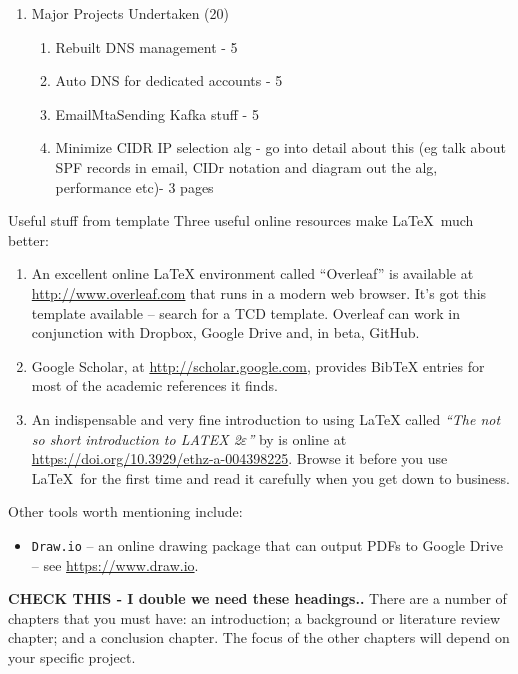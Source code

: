 \begin{enumerate}
    \item Major Projects Undertaken (20)
    \begin{enumerate}
    	\item Rebuilt DNS management - 5
        \item Auto DNS for dedicated accounts - 5
    	\item EmailMtaSending Kafka stuff - 5
    	\item Minimize CIDR IP selection alg - go into detail about this (eg talk about SPF records in email, CIDr notation and diagram out the alg, performance etc)- 3 pages
    \end{enumerate}
    
\end{enumerate}


Useful stuff from template
Three useful online resources make \LaTeX~much better:
\begin{enumerate}
\item An excellent online \LaTeX{} environment called ``Overleaf'' is available at \url{http://www.overleaf.com} that runs in a modern web browser. It's got this template available -- search for a TCD template. Overleaf can work in conjunction with Dropbox, Google Drive and, in beta, GitHub.
\item Google Scholar, at \url{http://scholar.google.com}, provides BibTeX entries for most of the academic references it finds.
\item An indispensable and very fine introduction to using \LaTeX{} called \emph{``The not so short introduction to LATEX 2$\varepsilon$''} by \citet{oetiker2001not} is online at \url{https://doi.org/10.3929/ethz-a-004398225}. Browse it before you use \LaTeX~for the first time and  read it carefully when you get down to business.
\end{enumerate}
Other tools worth mentioning include:
\begin{itemize}
\item \texttt{Draw.io} -- an online drawing package that can output PDFs to Google Drive -- see \url{https://www.draw.io}.
\end{itemize}

\textbf{CHECK THIS - I double we need these headings..}
There are a number of chapters that you must have: an introduction; a background or literature review chapter; and a conclusion chapter. The focus of the other chapters will depend on your specific project.
